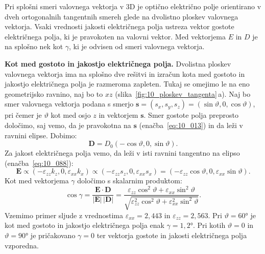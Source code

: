 Pri splošni smeri valovnega vektorja v 3D je optično električno polje orientirano
v dveh ortogonalnih tangentnih smereh glede na dvolistno ploskev valovnega vektorja. Vsaki
vrednosti jakosti električnega polja ustreza vektor gostote električnega polja, ki je pravokoten
na valovni vektor. Med vektorjema $E$ in $D$ je na splošno nek kot $\gamma$, ki je odvisen od smeri valovnega
vektorja.

\begin{example}{\bf Kot med gostoto in jakostjo električnega polja.}
Dvolistna ploskev valovnega vektorja ima na splošno dve rešitvi in izračun kota med gostoto
in jakostjo električnega polja je razmeroma zapleten. Tukaj se omejimo le na eno geometrijsko
ravnino, naj bo to $xz$ (slika~\ref{fig:10_ploskev_tangenta}\,a). Naj bo smer valovnega vektorja
podana s smerjo $\mathbf{s}=(s_x, s_y, s_z) = (\sin\vartheta, 0, \cos\vartheta)$, pri čemer je $\vartheta$
kot med osjo $z$ in vektorjem $\mathbf{s}$. Smer gostote polja preprosto določimo, saj vemo, da
je pravokotna na $\mathbf{s}$ (enačba~\ref{eq:10_013}) in da leži v ravnini elipse. Dobimo:
\begin{equation}
\mathbf{D} = D_0 (-\cos\vartheta, 0, \sin\vartheta).
\label{eq:10_091}
\end{equation}
Za jakost električnega polja vemo, da leži v isti ravnini tangentno na elipso (enačba~\ref{eq:10_088}):
\begin{equation}
\mathbf{E} \propto (-\varepsilon_{zz}k_z, 0, \varepsilon_{xx}k_x) \propto
(-\varepsilon_{zz}s_z, 0, \varepsilon_{xx}s_x) = (-\varepsilon_{zz}\cos\vartheta, 0, \varepsilon_{xx}\sin\vartheta).
\label{eq:10_092}
\end{equation}
Kot med vektorjema $\gamma$ določimo s skalarnim produktom:
\begin{equation}
\cos \gamma = \frac{\mathbf{E}\cdot\mathbf{D}}{|\mathbf{E}|\,|\mathbf{D}|} = 
\frac{\varepsilon_{zz}\cos^2\vartheta + \varepsilon_{xx}\sin^2\vartheta}
{\sqrt{\varepsilon_{zz}^2\cos^2\vartheta + \varepsilon_{xx}^2\sin^2\vartheta}}.
\label{eq:10_093}
\end{equation}
Vzemimo primer sljude z vrednostima $\varepsilon_{xx} = 2,443$ in $\varepsilon_{zz} = 2,563$.
Pri $\vartheta = 60\si{\degree}$ je kot med gostoto in jakostjo električnega polja
enak $\gamma = 1,2\si{\degree}$. Pri kotih $\vartheta = 0$ in $\vartheta = 90\si{\degree}$ je pričakovano
$\gamma=0$ ter vektorja gostote in jakosti električnega polja vzporedna.
\end{example}


